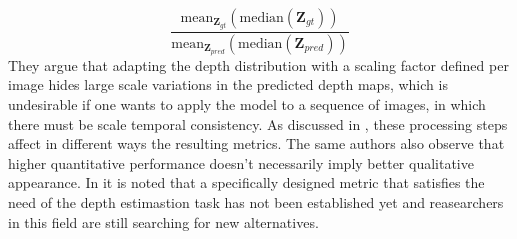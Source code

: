 \[
	\frac{
		\text{mean}_{\mathbf{Z}_{gt}} (\text{median} ( \mathbf{Z}_{gt}))
	}{
		\text{mean}_{\mathbf{Z}_{pred}} (\text{median} ( \mathbf{Z}_{pred}))
	}
\]
They argue that adapting the depth distribution with a scaling factor defined per image hides large scale variations in the predicted depth maps, which is undesirable if one wants to apply the model to a sequence of images, in which there must be scale temporal consistency.
As discussed in \cite{evalStudy}, these processing steps affect in different ways the resulting metrics.
The same authors also observe that higher quantitative performance doesn't necessarily imply better qualitative appearance.
In \cite{monocular2024} it is noted that a specifically designed metric that satisfies the need of the depth estimastion task has not been established yet and reasearchers in this field are still searching for new alternatives.



